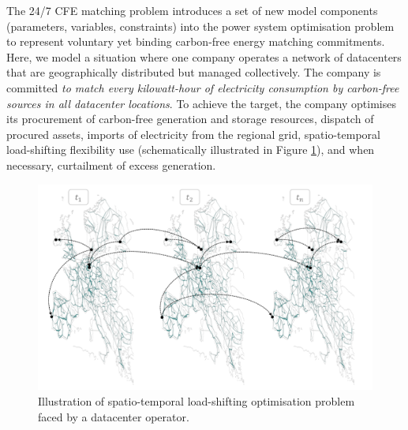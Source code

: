 
The 24/7 CFE matching problem introduces a set of new model components (parameters, variables, constraints) into the power system optimisation problem to represent voluntary yet binding carbon-free energy matching commitments. Here, we model a situation where one company operates a network of datacenters that are geographically distributed but managed collectively. The company is committed \textit{to match every kilowatt-hour of electricity consumption by carbon-free sources in all datacenter locations}. To achieve the target, the company optimises its procurement of carbon-free generation and storage resources, dispatch of procured assets, imports of electricity from the regional grid, spatio-temporal load-shifting flexibility use (schematically illustrated in Figure \ref{fig:space-time-optimisation}), and when necessary, curtailment of excess generation.

\begin{figure}[b]
    \centering
    \includegraphics[width=1\columnwidth]{img/datacenter-problem.png}
    \caption{Illustration of spatio-temporal load-shifting optimisation problem faced by a datacenter operator.}
    \label{fig:space-time-optimisation}
\end{figure}

